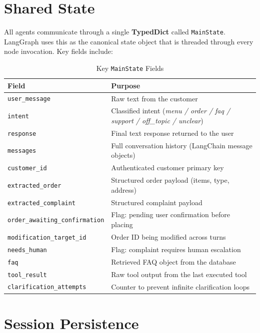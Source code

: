 \documentclass[12pt,a4paper]{report}
\begin{document}
\section{Shared State}

All agents communicate through a single \textbf{TypedDict} called \texttt{MainState}.
LangGraph uses this as the canonical state object that is threaded through every node
invocation. Key fields include:

\begin{table}[H]
\centering
\caption{Key \texttt{MainState} Fields}
\begin{tabularx}{\textwidth}{lX}
\toprule
\textbf{Field} & \textbf{Purpose} \\
\midrule
\texttt{user\_message}              & Raw text from the customer \\
\texttt{intent}                     & Classified intent (\textit{menu / order / faq / support / off\_topic / unclear}) \\
\texttt{response}                   & Final text response returned to the user \\
\texttt{messages}                   & Full conversation history (LangChain message objects) \\
\texttt{customer\_id}               & Authenticated customer primary key \\
\texttt{extracted\_order}           & Structured order payload (items, type, address) \\
\texttt{extracted\_complaint}       & Structured complaint payload \\
\texttt{order\_awaiting\_confirmation} & Flag: pending user confirmation before placing \\
\texttt{modification\_target\_id}   & Order ID being modified across turns \\
\texttt{needs\_human}               & Flag: complaint requires human escalation \\
\texttt{faq}                        & Retrieved FAQ object from the database \\
\texttt{tool\_result}               & Raw tool output from the last executed tool \\
\texttt{clarification\_attempts}    & Counter to prevent infinite clarification loops \\
\bottomrule
\end{tabularx}
\end{table}

\section{Session Persistence}
\end{document}

